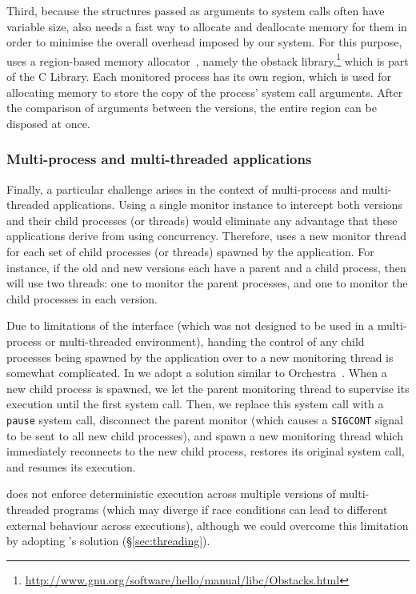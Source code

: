 Third, because the structures passed as arguments to system calls often have
variable size, \mxm also needs a fast way to allocate and deallocate memory
for them in order to minimise the overall overhead imposed by our system.  For
this purpose, \mxm uses a region-based memory allocator~\cite{memory-pools},
namely the \textsf{obstack}
library,\footnote{\url{http://www.gnu.org/software/hello/manual/libc/Obstacks.html}}
which is part of the \gnu C Library.  Each monitored process has its own
region, which is used for allocating memory to store the copy of the process'
system call arguments. After the comparison of arguments between the versions,
the entire region can be disposed at once.

\subsubsection{Multi-process and multi-threaded applications}

Finally, a particular challenge arises in the context of multi-process and
multi-threaded applications.  Using a single monitor instance to intercept both
versions and their child processes (or threads) would eliminate any advantage
that these applications derive from using concurrency.  Therefore, \mxm uses a
new monitor thread for each set of child processes (or threads) spawned by the
application.  For instance, if the old and new versions each have a parent and
a child process, then \mxm will use two threads: one to monitor the parent
processes, and one to monitor the child processes in each version.

Due to limitations of the \ptrace interface (which was not designed to be used
in a multi-process or multi-threaded environment), handing the control of any
child processes being spawned by the application over to a new monitoring
thread is somewhat complicated.  In \mxm we adopt a solution similar to
Orchestra~\cite{orchestra09}.  When a new child process is spawned, we let the
parent monitoring thread to supervise its execution until the first system
call.  Then, we replace this system call with a \lstinline`pause` system call,
disconnect the parent monitor (which causes a \lstinline`SIGCONT` signal to be
sent to all new child processes), and spawn a new monitoring thread which
immediately reconnects to the new child process, restores its original system
call, and resumes its execution.

\mxm does not enforce deterministic execution across multiple versions of
multi-threaded programs (which may diverge if race conditions can lead
to different external behaviour across executions), although we could
overcome this limitation by adopting \varan's solution
(\S\ref{sec:threading}).

